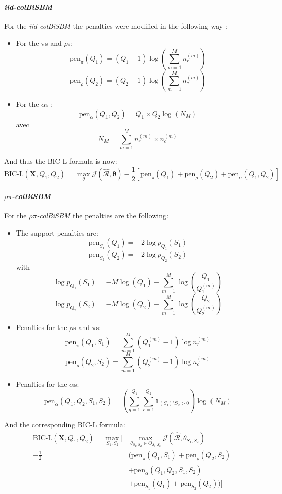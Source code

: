 \documentclass[12pt,a4paper]{report}
\begin{document}
\paragraph*{\textit{iid-colBiSBM}}
For the \textit{iid-colBiSBM} the penalties were modified in the following way :

\begin{itemize}
    \item For the $\pi$s and $\rho$s:
          \[\text{pen}_{\pi}(Q_1) = (Q_1 - 1)\log(\sum_{m=1}^{M}n_{r}^{(m)})\]
          \[\text{pen}_{\rho}(Q_2) = (Q_2 - 1)\log(\sum_{m=1}^{M}n_{c}^{(m)})\]
    \item For the $\alpha$s :
          \[\text{pen}_{\alpha}(Q_1, Q_2) = Q_1 \times Q_2 \log(N_M)\]
          avec
          \[ N_M = \sum_{m = 1}^{M} n_{r}^{(m)} \times n_{c}^{(m)} \]
\end{itemize}
And thus the $\text{BIC-L}$ formula is now:
\[ \text{BIC-L}(\bm{X},Q_1, Q_2) = \max_{\theta} \mathcal{J} (\mathcal{\hat{R}}, \bm{\theta})
    - \frac{1}{2} [\text{pen}_{\pi}(Q_1) + \text{pen}_{\rho}(Q_2) + \text{pen}_{\alpha}(Q_1, Q_2)]\]

\paragraph*{\textit{$\rho\pi$-colBiSBM}}
For the \textit{$\rho\pi$-colBiSBM} the penalties are the following:

\begin{itemize}
    \item The support penalties are:
          \[ \text{pen}_{S_1}(Q_1) = -2 \log p_{Q_1} (S_1) \]
          \[ \text{pen}_{S_2}(Q_2) = -2 \log p_{Q_2} (S_2) \]
          with
          \[ \log p_{Q_1}(S_1) = - M \log(Q_1) - \sum_{m=1}^{M} \log {Q_1 \choose Q_1^{(m)}} \]
          \[ \log p_{Q_2}(S_2) = - M \log(Q_2) - \sum_{m=1}^{M} \log {Q_2 \choose Q_2^{(m)}} \]
    \item Penalties for the $\rho$s and $\pi$s:
          \[ \text{pen}_{\pi}(Q_1, S_1) = \sum_{m=1}^{M} (Q_{1}^{(m)} - 1) \log n_{r}^{(m)} \]
          \[ \text{pen}_{\rho}(Q_2, S_2) = \sum_{m=1}^{M} (Q_{2}^{(m)} - 1) \log n_{c}^{(m)} \]
    \item Penalties for the $\alpha$s:
          \[ \text{pen}_{\alpha}(Q_1, Q_2, S_1, S_2) = (\sum_{q=1}^{Q_1} \sum_{r=1}^{Q_2} \mathbb{1}_{(S_1)'S_2 > 0}) \log (N_M) \]
\end{itemize}
And the corresponding BIC-L formula:
\[
    \begin{aligned}
        \text{BIC-L}(\bm{X},Q_1, Q_2) =
        \max_{S_1,S_2} [
                      & \max_{\theta_{S_1,S_2} \in \Theta_{S_1,S_2}} \mathcal{J}(\mathcal{\hat{R}},\theta_{S_1,S_2}) \\
        - \frac{1}{2} & (\text{pen}_{\pi}(Q_1, S_1)  + \text{pen}_{\rho}(Q_2, S_2)                                   \\
                      & + \text{pen}_{\alpha}(Q_1, Q_2, S_1, S_2)                                                    \\
                      & + \text{pen}_{S_1}(Q_1) + \text{pen}_{S_2}(Q_2))]                                            \\
    \end{aligned}
\]
\end{document}
